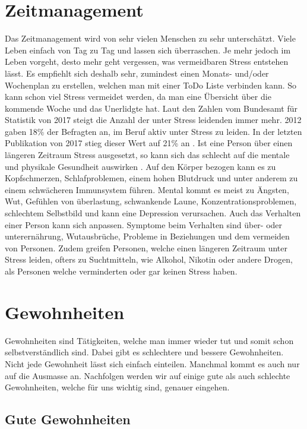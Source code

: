 \section{Zeitmanagement}
Das Zeitmanagement wird von sehr vielen Menschen zu sehr unterschätzt. Viele Leben einfach von Tag zu Tag und lassen sich überraschen. Je mehr jedoch im Leben vorgeht, desto mehr geht vergessen, was vermeidbaren Stress entstehen lässt. 
\newline
Es empfiehlt sich deshalb sehr, zumindest einen Monats- und/oder Wochenplan zu erstellen, welchen man mit einer ToDo Liste verbinden kann. So kann schon viel Stress vermeidet werden, da man eine Übersicht über die kommende Woche und das Unerlidgte hat. 
\newline
Laut den Zahlen vom Bundesamt für Statistik von 2017 steigt die Anzahl der unter Stress leidenden immer mehr. 2012 gaben 18\% der Befragten an, im Beruf aktiv unter Stress zu leiden. In der letzten Publikation von 2017 stieg dieser Wert auf 21\% an \cite{bundesamtfrstatistik_2019_arbeitsbedingungen}. Ist eine Person über einen längeren Zeitraum Stress ausgesetzt, so kann sich das schlecht auf die mentale und physikale Gesundheit auswirken \cite{stress-symptoms}. Auf den Körper bezogen kann es zu Kopfschmerzen, Schlafproblemen, einem hohen Blutdruck und unter anderem zu einem schwächeren Immunsystem führen. Mental kommt es meist zu Ängsten, Wut, Gefühlen von überlastung, schwankende Laune, Konzentrationsproblemen, schlechtem Selbstbild und kann eine Depression verursachen. Auch das Verhalten einer Person kann sich anpassen. Symptome beim Verhalten sind über- oder unterernährung, Wutausbrüche, Probleme in Beziehungen und dem vermeiden von Personen. Zudem greifen Personen, welche einen längeren Zeitraum unter Stress leiden, ofters zu Suchtmitteln, wie Alkohol, Nikotin oder andere Drogen, als Personen welche verminderten oder gar keinen Stress haben.
\section{Gewohnheiten}
Gewohnheiten sind Tätigkeiten, welche man immer wieder tut und somit schon selbstverständlich sind. Dabei gibt es schlechtere und bessere Gewohnheiten.
\newline
Nicht jede Gewohnheit lässt sich einfach einteilen. Manchmal kommt es auch nur auf die Ausmasse an.
\newline
Nachfolgen werden wir auf einige gute als auch schlechte Gewohnheiten, welche für uns wichtig sind, genauer eingehen.
\subsection{Gute Gewohnheiten}
